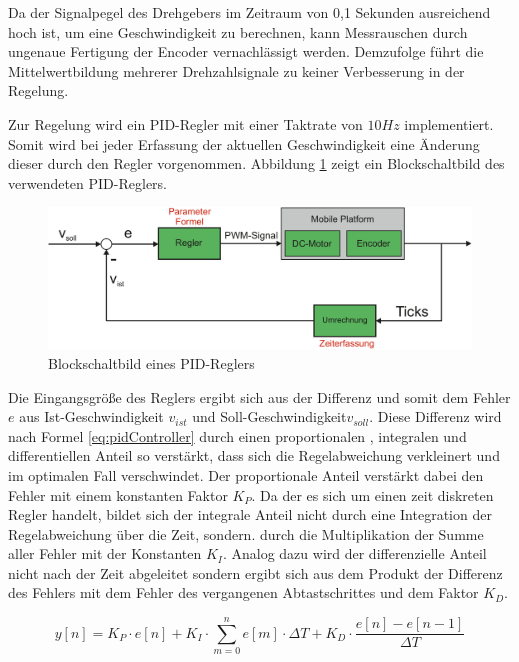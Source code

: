 \documentclass[12pt,a4paper,oneside]{article}
\begin{document}
\begin{spacing}{1.15}
Da der Signalpegel des Drehgebers im Zeitraum von 0,1 Sekunden ausreichend hoch ist, um eine Geschwindigkeit zu berechnen, kann Messrauschen durch ungenaue Fertigung der Encoder vernachlässigt werden. Demzufolge führt die Mittelwertbildung mehrerer Drehzahlsignale zu keiner Verbesserung in der Regelung.

Zur Regelung wird ein PID-Regler mit einer Taktrate von $10Hz$ implementiert. Somit wird bei jeder Erfassung der aktuellen Geschwindigkeit eine Änderung dieser durch den Regler vorgenommen. Abbildung \ref{fig:PID_controller}  zeigt ein Blockschaltbild des verwendeten PID-Reglers. 

\begin{figure}[!htb]
	\centering
	\includegraphics[scale=.5]{figs/PID_controller}
	\caption{Blockschaltbild eines PID-Reglers}
	\label{fig:PID_controller}
\end{figure}

Die Eingangsgröße des Reglers ergibt sich aus der Differenz und somit dem Fehler $e$ aus Ist-Geschwindigkeit $v_{ist}$ und Soll-Geschwindigkeit$v_{soll}$. Diese Differenz wird nach Formel \ref{eq:pidController} durch einen proportionalen , integralen und differentiellen Anteil so verstärkt, dass sich die Regelabweichung verkleinert und im optimalen Fall verschwindet. Der proportionale Anteil verstärkt dabei den Fehler mit einem konstanten Faktor $K_{P}$. Da der es sich um einen zeit diskreten Regler handelt, bildet sich der integrale Anteil nicht durch eine Integration der Regelabweichung über die Zeit, sondern. durch die Multiplikation der Summe aller Fehler mit der Konstanten $K_{I}$. Analog dazu wird der differenzielle Anteil nicht nach der Zeit abgeleitet sondern ergibt sich aus dem Produkt der Differenz des Fehlers mit dem Fehler des vergangenen Abtastschrittes und dem Faktor $K_{D}$. 

\begin{center}
	\begin{equation}
	y[n] =  K_{P}\cdot e[n] + K_{I} \cdot \sum\limits_{m=0}^n e[m] \cdot \Delta T+ K_{D} \cdot \frac{e[n] - e[n-1]}{\Delta T}
	\label{eq:pidController}
	\end{equation}
\end{center} 


\end{spacing}
\end{document}
